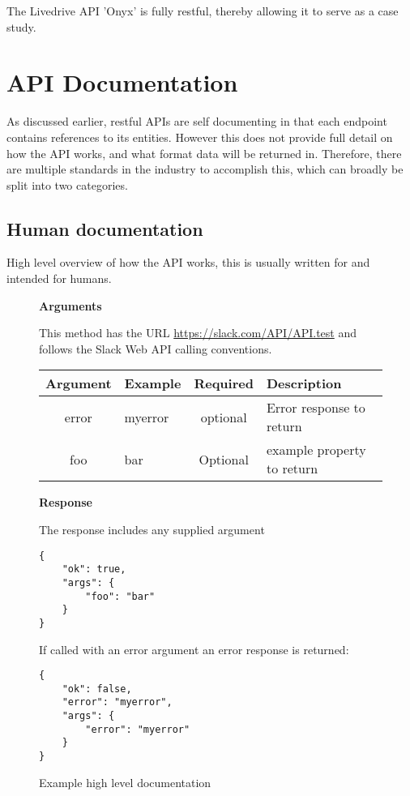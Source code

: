 The Livedrive API 'Onyx' is fully restful, thereby allowing it to serve as a case study.



\section{API Documentation}

As discussed earlier, restful APIs are self documenting in that each endpoint contains references to its entities. However this does not provide full detail on how the API works, and what format data will be returned in. Therefore, there are multiple standards in the industry to accomplish this, which can broadly be split into two categories.

\subsection{Human documentation}

High level overview of how the API works, this is usually written for and intended for humans.

\begin{figure}[ht]

\textbf{Arguments}

This method has the URL \url{https://slack.com/API/API.test} and follows the Slack Web API calling conventions.

\begin{tabularx}{\textwidth}{c|X|c|X}
\textbf{Argument} & \textbf{Example} & \textbf{Required} & \textbf{Description} \\ \hline
error & myerror & optional & Error response to return \\
foo & bar & Optional & example property to return \\
\end{tabularx}


\textbf{Response}

The response includes any supplied argument

\begin{code}
\begin{verbatim}
{
    "ok": true,
    "args": {
        "foo": "bar"
    }
}
\end{verbatim}
\end{code}

If called with an error argument an error response is returned:

\begin{code}
\begin{verbatim}
{
    "ok": false,
    "error": "myerror",
    "args": {
        "error": "myerror"
    }
}
\end{verbatim}
\end{code}
\caption{Example high level documentation}
\end{figure}

